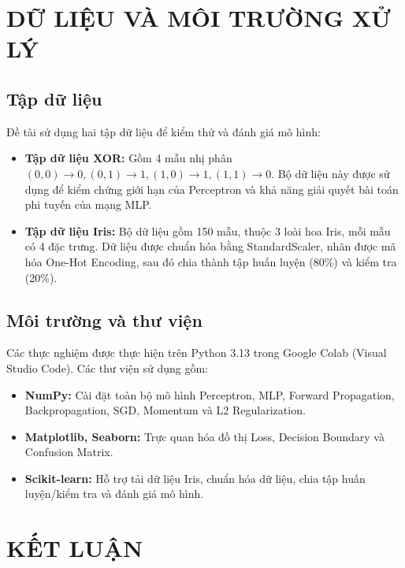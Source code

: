 \documentclass[12pt,a4paper]{report}
\begin{document}
\chapter{DỮ LIỆU VÀ MÔI TRƯỜNG XỬ LÝ}

\section{Tập dữ liệu}
Đề tài sử dụng hai tập dữ liệu để kiểm thử và đánh giá mô hình:
\begin{itemize}
    \item \textbf{Tập dữ liệu XOR:} Gồm 4 mẫu nhị phân $(0,0) \rightarrow 0, (0,1) \rightarrow 1, (1,0) \rightarrow 1, (1,1) \rightarrow 0$. Bộ dữ liệu này được sử dụng để kiểm chứng giới hạn của Perceptron và khả năng giải quyết bài toán phi tuyến của mạng MLP.
    \item \textbf{Tập dữ liệu Iris:} Bộ dữ liệu gồm 150 mẫu, thuộc 3 loài hoa Iris, mỗi mẫu có 4 đặc trưng. Dữ liệu được chuẩn hóa bằng StandardScaler, nhãn được mã hóa One-Hot Encoding, sau đó chia thành tập huấn luyện (80\%) và kiểm tra (20\%).
\end{itemize}

\section{Môi trường và thư viện}
Các thực nghiệm được thực hiện trên Python 3.13 trong Google Colab (Visual Studio Code).
Các thư viện sử dụng gồm:
\begin{itemize}
    \item \textbf{NumPy:} Cài đặt toàn bộ mô hình Perceptron, MLP, Forward Propagation, Backpropagation, SGD, Momentum và L2 Regularization.
    \item \textbf{Matplotlib, Seaborn:} Trực quan hóa đồ thị Loss, Decision Boundary và Confusion Matrix.
    \item \textbf{Scikit-learn:} Hỗ trợ tải dữ liệu Iris, chuẩn hóa dữ liệu, chia tập huấn luyện/kiểm tra và đánh giá mô hình.
\end{itemize}

\chapter{KẾT LUẬN}
\end{document}
